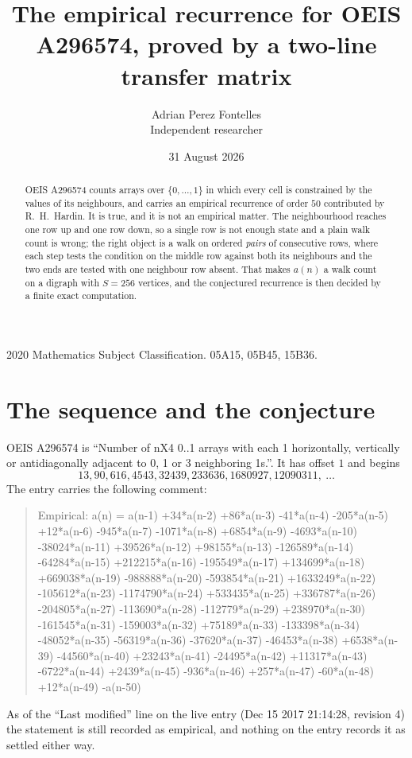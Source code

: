 \documentclass[11pt,a4paper]{article}
\title{The empirical recurrence for OEIS A296574, proved by a two-line transfer matrix}
\author{Adrian Perez Fontelles\\ \small Independent researcher}
\date{31 August 2026}
\theoremstyle{plain}
\theoremstyle{definition}
\begin{document}
\maketitle

\begin{abstract}
OEIS A296574 counts arrays over $\{0,\dots,1\}$ in which every cell is constrained by the
values of its neighbours, and carries an empirical recurrence of order $50$ contributed
by R.~H.~Hardin. It is true, and it is not an empirical matter. The neighbourhood reaches one
row up and one row down, so a single row is not enough state and a plain walk count
is wrong; the right object is a walk on ordered \emph{pairs} of consecutive rows, where
each step tests the condition on the middle row against both its neighbours and the two
ends are tested with one neighbour row absent. That makes $a(n)$ a walk count on a digraph
with $S=256$ vertices, and the conjectured recurrence is then decided by a finite exact
computation.
\end{abstract}

\noindent\small 2020 Mathematics Subject Classification. 05A15, 05B45, 15B36.\normalsize

\section{The sequence and the conjecture}

OEIS A296574 is ``Number of nX4 0..1 arrays with each 1 horizontally, vertically or antidiagonally adjacent to 0, 1 or 3 neighboring 1s.''. It has offset $1$ and begins
\[
13, 90, 616, 4543, 32439, 233636, 1680927, 12090311,\ \dots
\]
The entry carries the following comment:
\begin{quote}\small
Empirical: a(n) = a(n-1) +34*a(n-2) +86*a(n-3) -41*a(n-4) -205*a(n-5) +12*a(n-6) -945*a(n-7) -1071*a(n-8) +6854*a(n-9) -4693*a(n-10) -38024*a(n-11) +39526*a(n-12) +98155*a(n-13) -126589*a(n-14) -64284*a(n-15) +212215*a(n-16) -195549*a(n-17) +134699*a(n-18) +669038*a(n-19) -988888*a(n-20) -593854*a(n-21) +1633249*a(n-22) -105612*a(n-23) -1174790*a(n-24) +533435*a(n-25) +336787*a(n-26) -204805*a(n-27) -113690*a(n-28) -112779*a(n-29) +238970*a(n-30) -161545*a(n-31) -159003*a(n-32) +75189*a(n-33) -133398*a(n-34) -48052*a(n-35) -56319*a(n-36) -37620*a(n-37) -46453*a(n-38) +6538*a(n-39) -44560*a(n-40) +23243*a(n-41) -24495*a(n-42) +11317*a(n-43) -6722*a(n-44) +2439*a(n-45) -936*a(n-46) +257*a(n-47) -60*a(n-48) +12*a(n-49) -a(n-50)
\end{quote}
As of the ``Last modified'' line on the live entry (Dec 15 2017 21:14:28, revision 4) the statement is
still recorded as empirical, and nothing on the entry records it as settled either way.
\end{document}

